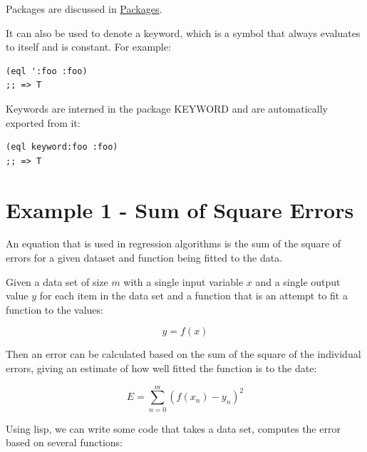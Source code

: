 \documentclass[11pt]{article}
\begin{document}
Packages are discussed in \hyperref[sec-18]{Packages}.

It can also be used to denote a keyword, which is a symbol that
always evaluates to itself and is constant. For example:

\begin{verbatim}
(eql ':foo :foo)
;; => T
\end{verbatim}

Keywords are interned in the package KEYWORD and are automatically
exported from it:

\begin{verbatim}
(eql keyword:foo :foo)
;; => T
\end{verbatim}

\section{Example 1 - Sum of Square Errors}
\label{sec-3}

An equation that is used in regression algorithms is the sum of
the square of errors for a given dataset and function being fitted
to the data.

Given a data set of size $m$ with a single input variable $x$ and a
single output value $y$ for each item in the data set
and a function that is an attempt to fit a function to the values:

$$y = f(x)$$

Then an error can be calculated based on the sum of the square of
the individual errors, giving an estimate of how well fitted the
function is to the date:

$$E = \sum_{n=0}^m(f(x_n) - y_n)^2$$

Using lisp, we can write some code that takes a data set, computes
the error based on several functions:
\end{document}
